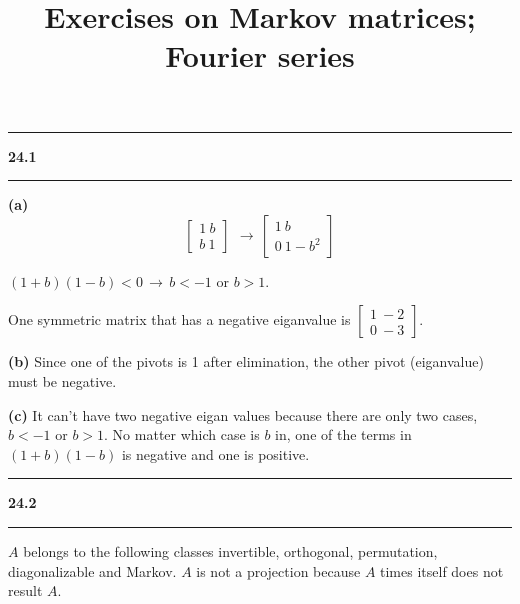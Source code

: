 \documentclass[11pt]{article}
\newcommand\question[2]{\vspace{.25in}\hrule\textbf{#1 #2}\vspace{.5em}\hrule\vspace{.10in}}
\renewcommand\part[1]{\vspace{.10in}\textbf{(#1)}}
\begin{document}
\raggedright
\newcommand\NAME{Haiying Cui}  %
\newcommand\ANDREWID{Christy}     %
\newcommand\HWNUM{24}              %

\title{Exercises on Markov matrices; Fourier series}
\maketitle

\question{24.1}{}
\part{a} $$\begin{bmatrix} 1 \ b \\ b \ 1 \end{bmatrix}\ \,\to\, \begin{bmatrix} 1 \ b \\ 0 \ 1-b^2\end{bmatrix}$$

\((1+b)(1-b) < 0 \,\to\, b < -1\) or \(b > 1\). 

One symmetric matrix that has a negative eiganvalue is \(\begin{bmatrix} 1 \ -2 \\ 0 \ -3 \end{bmatrix}\).

\part{b} Since one of the pivots is 1 after elimination, the other pivot (eiganvalue) must be negative.

\part{c} It can't have two negative eigan values because there are only two cases, \(b < -1\) or \(b > 1\). No matter which case is \(b\) in, one of the terms in \((1+b)(1-b)\) is negative and one is positive.

\question{24.2}{}
\(A\) belongs to the following classes invertible, orthogonal, permutation, diagonalizable and Markov. \(A\) is not a projection because \(A\) times itself does not result \(A\). 
\end{document}
